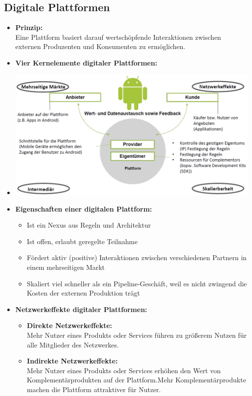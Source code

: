 \documentclass[12pt,a4paper]{article}
\begin{document}
\subsection{Digitale Plattformen} %
\begin{itemize}
   \item \textbf{Prinzip:}\\
         Eine Plattform basiert darauf wertschöpfende Interaktionen zwischen externen Produzenten und Konsumenten zu ermöglichen.
   
   
   \newpage
   \item \textbf{Vier Kernelemente digitaler Plattformen:}
   \item[] \includegraphics[scale=0.42]{VierKernelemente.png}
   
   \item \textbf{Eigenschaften einer digitalen Plattform:}
         \begin{itemize}
            \item Ist ein Nexus aus Regeln und Architektur
            \item Ist offen, erlaubt geregelte Teilnahme
            \item Fördert aktiv (positive) Interaktionen zwischen verschiedenen Partnern in einem mehrseitigen Markt
            \item Skaliert viel schneller als ein Pipeline-Geschäft, weil es nicht zwingend die Kosten der externen Produktion trägt
         \end{itemize}
   
   \item \textbf{Netzwerkeffekte digitaler Plattformen:}
         \begin{itemize}
            \item \textbf{Direkte Netzwerkeffekte:}\\
                  Mehr Nutzer eines Produkts oder Services führen zu größerem Nutzen für alle Mitglieder des Netzwerkes.
            \item \textbf{Indirekte Netzwerkeffekte:}\\
                  Mehr Nutzer eines Produkts oder Services erhöhen den Wert von Komplementärprodukten auf der Plattform.Mehr Komplementärprodukte machen die Plattform attraktiver für Nutzer.
         \end{itemize}
   

\end{itemize}
\end{document}
